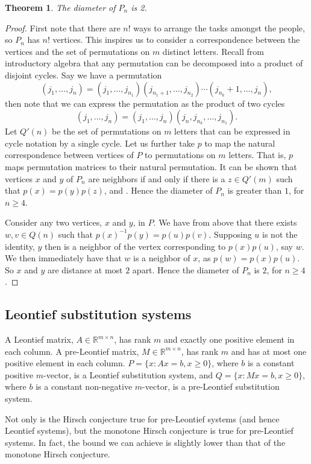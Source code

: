 \documentclass[11pt,a4paper]{article}
\newtheorem{thm}{Theorem}[section]
\theoremstyle{definition}
\begin{document}
\begin{thm}
	The diameter of $P_n$ is 2.
\end{thm} 
\begin{proof}
First note that there are $n!$ ways to arrange the tasks amongst the people, so $P_n$ has $n!$ vertices. This inspires us to consider a correspondence between the vertices and the set of permutations on $m$ distinct letters. Recall from introductory algebra that any permutation can be decomposed into a product of disjoint cycles. Say we have a permutation $$(j_1,\ldots,j_n)=(j_1,\ldots,j_{n_1})(j_{n_1+1},\ldots,j_{n_2})\cdots(j_{n_k}+1,\ldots,j_n),$$ then note that we can express the permutation as the product of two cycles $$(j_1,\ldots,j_n)=(j_1,\ldots,j_n)(j_n,j_{n_k},\ldots,j_{n_1}).$$
Let $Q'(n)$ be the set of permutations on $m$ letters that can be expressed in cycle notation by a single cycle. Let us further take $p$ to map the natural correspondence between vertices of $P$ to permutations on $m$ letters. That is, $p$ maps permutation matrices to their natural permutation. It can be shown that vertices $x$ and $y$ of $P_n$ are neighbors if and only if there is a $z\in Q'(m)$ such that $p(x)=p(y)p(z)$, \citep{bal74} and \citep{young78}. Hence the diameter of $P_n$ is greater than $1$, for $n\ge 4$.

Consider any two vertices, $x$ and $y$, in $P$. We have from above that there exists $w,v\in Q(n)$ such that $p(x)^{-1}p(y)=p(u)p(v)$. Supposing $u$ is not the identity, $y$ then is a neighbor of the vertex corresponding to $p(x)p(u)$, say $w$. We then immediately have that $w$ is a neighbor of $x$, as $p(w)=p(x)p(u)$. So $x$ and $y$ are distance at most $2$ apart. Hence the diameter of $P_n$ is $2$, for $n\ge 4$.
\end{proof}
\subsection{Leontief substitution systems}
A Leontief matrix, $A\in\mathbb{R}^{m\times n}$, has rank $m$ and exactly one positive element in each column. A pre-Leontief matrix, $M\in\mathbb{R}^{m\times n}$, has rank $m$ and has at most one positive element in each column. $P=\{x : Ax=b,x\ge 0\}$, where $b$ is a constant positive $m$-vector, is a Leontief substitution system, and $Q=\{x : Mx=b,x\ge 0\}$, where $b$ is a constant non-negative $m$-vector, is a pre-Leontief substitution system.

Not only is the Hirsch conjecture true for pre-Leontief systems (and hence Leontief systems), but the monotone Hirsch conjecture is true for pre-Leontief systems. In fact, the bound we can achieve is slightly lower than that of the monotone Hirsch conjecture.
\end{document}
